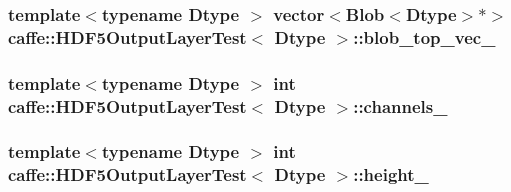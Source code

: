 \hypertarget{classcaffe_1_1_h_d_f5_output_layer_test_a7d062445759c5dc03e94de9e78794311}{
\subsubsection[{blob\+\_\+top\+\_\+vec\+\_\+}]{\setlength{\rightskip}{0pt plus 5cm}template$<$typename Dtype $>$ vector$<${\bf Blob}$<$Dtype$>$$\ast$$>$ {\bf caffe\+::\+H\+D\+F5\+Output\+Layer\+Test}$<$ Dtype $>$\+::blob\+\_\+top\+\_\+vec\+\_\+\hspace{0.3cm}{\ttfamily [protected]}}}\label{classcaffe_1_1_h_d_f5_output_layer_test_a7d062445759c5dc03e94de9e78794311}
\hypertarget{classcaffe_1_1_h_d_f5_output_layer_test_a08738f3c6c8b50d963684e9b036f1402}{
\subsubsection[{channels\+\_\+}]{\setlength{\rightskip}{0pt plus 5cm}template$<$typename Dtype $>$ int {\bf caffe\+::\+H\+D\+F5\+Output\+Layer\+Test}$<$ Dtype $>$\+::channels\+\_\+\hspace{0.3cm}{\ttfamily [protected]}}}\label{classcaffe_1_1_h_d_f5_output_layer_test_a08738f3c6c8b50d963684e9b036f1402}
\hypertarget{classcaffe_1_1_h_d_f5_output_layer_test_a542fea46c7211a5e74aa414291414e0d}{
\subsubsection[{height\+\_\+}]{\setlength{\rightskip}{0pt plus 5cm}template$<$typename Dtype $>$ int {\bf caffe\+::\+H\+D\+F5\+Output\+Layer\+Test}$<$ Dtype $>$\+::height\+\_\+\hspace{0.3cm}{\ttfamily [protected]}}}\label{classcaffe_1_1_h_d_f5_output_layer_test_a542fea46c7211a5e74aa414291414e0d}
